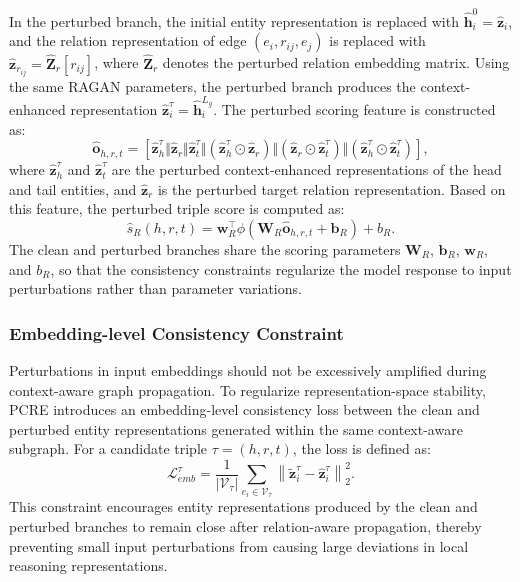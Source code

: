 \documentclass[pdflatex,sn-mathphys-num]{sn-jnl}
\begin{document}
In the perturbed branch, the initial entity representation is replaced with $\widehat{\mathbf{h}}_{i}^{0}=\widehat{\mathbf{z}}_{i}$, and the relation representation of edge $(e_i,r_{ij},e_j)$ is replaced with $\widehat{\mathbf{z}}_{r_{ij}}=\widehat{\mathbf{Z}}_{r}[r_{ij}]$, where $\widehat{\mathbf{Z}}_{r}$ denotes the perturbed relation embedding matrix. Using the same RAGAN parameters, the perturbed branch produces the context-enhanced representation $\widehat{\mathbf{z}}_{i}^{\tau}=\widehat{\mathbf{h}}_{i}^{L_g}$. The perturbed scoring feature is constructed as:
\begin{equation}
\widehat{\mathbf{o}}_{h,r,t}
=
\left[
\widehat{\mathbf{z}}_{h}^{\tau}
\Vert
\widehat{\mathbf{z}}_{r}
\Vert
\widehat{\mathbf{z}}_{t}^{\tau}
\Vert
\left(
\widehat{\mathbf{z}}_{h}^{\tau}
\odot
\widehat{\mathbf{z}}_{r}
\right)
\Vert
\left(
\widehat{\mathbf{z}}_{r}
\odot
\widehat{\mathbf{z}}_{t}^{\tau}
\right)
\Vert
\left(
\widehat{\mathbf{z}}_{h}^{\tau}
\odot
\widehat{\mathbf{z}}_{t}^{\tau}
\right)
\right],
\end{equation}
where $\widehat{\mathbf{z}}_{h}^{\tau}$ and $\widehat{\mathbf{z}}_{t}^{\tau}$ are the perturbed context-enhanced representations of the head and tail entities, and $\widehat{\mathbf{z}}_{r}$ is the perturbed target relation representation. Based on this feature, the perturbed triple score is computed as:
\begin{equation}
\widehat{s}_R(h,r,t)
=
\mathbf{w}_{R}^{\top}
\phi
\left(
\mathbf{W}_{R}
\widehat{\mathbf{o}}_{h,r,t}
+
\mathbf{b}_{R}
\right)
+
b_{R}.
\end{equation}
The clean and perturbed branches share the scoring parameters $\mathbf{W}_{R}$, $\mathbf{b}_{R}$, $\mathbf{w}_{R}$, and $b_{R}$, so that the consistency constraints regularize the model response to input perturbations rather than parameter variations.

\subsubsection{Embedding-level Consistency Constraint}

Perturbations in input embeddings should not be excessively amplified during context-aware graph propagation. To regularize representation-space stability, PCRE introduces an embedding-level consistency loss between the clean and perturbed entity representations generated within the same context-aware subgraph. For a candidate triple $\tau=(h,r,t)$, the loss is defined as:
\begin{equation}
\mathcal{L}_{emb}^{\tau}
=
\frac{1}{|\mathcal{V}_{\tau}|}
\sum_{e_i\in\mathcal{V}_{\tau}}
\left\|
\widetilde{\mathbf{z}}_{i}^{\tau}
-
\widehat{\mathbf{z}}_{i}^{\tau}
\right\|_{2}^{2}.
\end{equation}
This constraint encourages entity representations produced by the clean and perturbed branches to remain close after relation-aware propagation, thereby preventing small input perturbations from causing large deviations in local reasoning representations.
\end{document}
